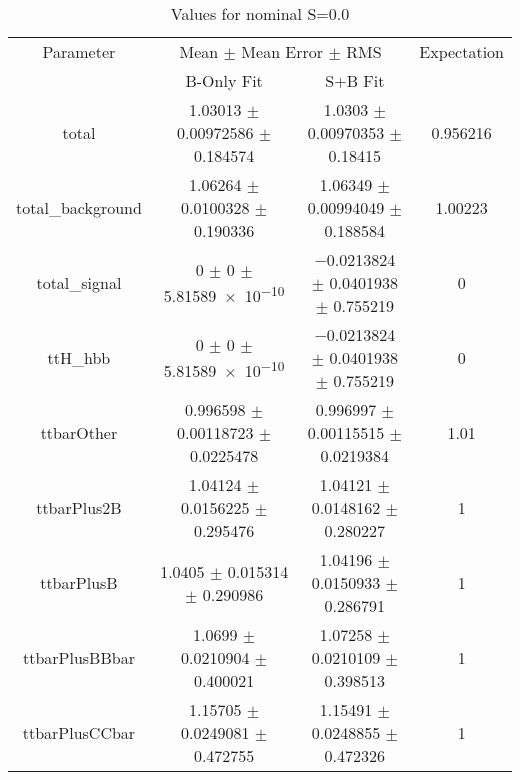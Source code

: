 \begin{table}
\centering
\caption{Values for nominal S=0.0}
\begin{tabular}{cccc}
\toprule
Parameter & \multicolumn{2}{c}{Mean $\pm$ Mean Error $\pm$ RMS} & Expectation\\
 & B-Only Fit & S+B Fit & \\
\midrule
total & \num{1.03013} $\pm$ \num{0.00972586} $\pm$ \num{0.184574} & \num{1.0303} $\pm$ \num{0.00970353} $\pm$ \num{0.18415} & \num{0.956216}\\
total\_background & \num{1.06264} $\pm$ \num{0.0100328} $\pm$ \num{0.190336} & \num{1.06349} $\pm$ \num{0.00994049} $\pm$ \num{0.188584} & \num{1.00223}\\
total\_signal & \num{0} $\pm$ \num{0} $\pm$ \num{5.81589e-10} & \num{-0.0213824} $\pm$ \num{0.0401938} $\pm$ \num{0.755219} & \num{0}\\
ttH\_hbb & \num{0} $\pm$ \num{0} $\pm$ \num{5.81589e-10} & \num{-0.0213824} $\pm$ \num{0.0401938} $\pm$ \num{0.755219} & \num{0}\\
ttbarOther & \num{0.996598} $\pm$ \num{0.00118723} $\pm$ \num{0.0225478} & \num{0.996997} $\pm$ \num{0.00115515} $\pm$ \num{0.0219384} & \num{1.01}\\
ttbarPlus2B & \num{1.04124} $\pm$ \num{0.0156225} $\pm$ \num{0.295476} & \num{1.04121} $\pm$ \num{0.0148162} $\pm$ \num{0.280227} & \num{1}\\
ttbarPlusB & \num{1.0405} $\pm$ \num{0.015314} $\pm$ \num{0.290986} & \num{1.04196} $\pm$ \num{0.0150933} $\pm$ \num{0.286791} & \num{1}\\
ttbarPlusBBbar & \num{1.0699} $\pm$ \num{0.0210904} $\pm$ \num{0.400021} & \num{1.07258} $\pm$ \num{0.0210109} $\pm$ \num{0.398513} & \num{1}\\
ttbarPlusCCbar & \num{1.15705} $\pm$ \num{0.0249081} $\pm$ \num{0.472755} & \num{1.15491} $\pm$ \num{0.0248855} $\pm$ \num{0.472326} & \num{1}\\
\bottomrule
\end{tabular}
\end{table}